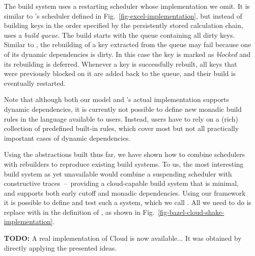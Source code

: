 The \Bazel build system uses a restarting scheduler whose implementation we
omit. It is similar to \Excel's  scheduler defined in
Fig.~\ref{fig-excel-implementation}, but instead of building keys in the order
specified by the persistently stored calculation chain, \Bazel uses a
\emph{build queue}. The build starts with the queue containing all dirty keys.
Similar to \Excel, the rebuilding of a key extracted from the queue may fail
because one of its dynamic dependencies is dirty. In this case the key is marked
as \emph{blocked} and its rebuilding is deferred. Whenever a key is successfully
rebuilt, all keys that were previously blocked on it are added back to the
queue, and their build is eventually restarted.

Note that although both our model and \Bazel's actual implementation supports
dynamic dependencies, it is currently not possible to define new monadic build
rules in the language available to users. Instead, users have to rely on a
(rich) collection of predefined built-in rules, which cover most but not all
practically important cases of dynamic dependencies.

Using the abstractions built thus far, we have shown how to combine schedulers
with rebuilders to reproduce existing build systems. To us, the most interesting
build system as yet unavailable would combine a suspending scheduler with
constructive traces~--~providing a cloud-capable build system that is minimal,
and supports both early cutoff and monadic dependencies. Using our framework it
is possible to define and test such a system, which we call \Cloud \Shake. All
we need to do is replace  with  in the definition
of \Bazel, as shown in Fig.~\ref{fig-bazel-cloud-shake-implementation}.

\textbf{TODO:} A real implementation of Cloud \Shake is now available... It was
obtained by directly applying the presented ideas.


